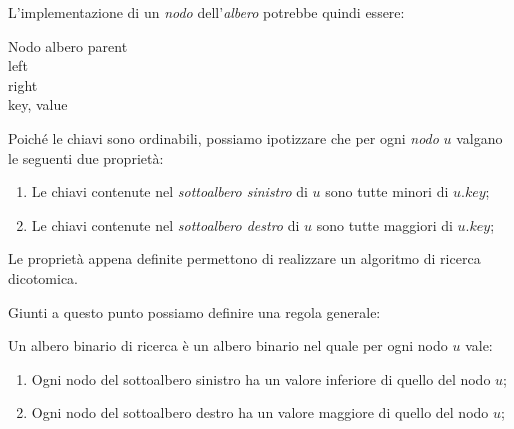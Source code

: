 L'implementazione di un \emph{nodo} dell'\emph{albero} potrebbe quindi essere:
\begin{code}{Nodo albero}
     parent\\
     left\\
     right\\
     key, value
\end{code}\noindent
Poiché le chiavi sono ordinabili, possiamo ipotizzare che per ogni \emph{nodo}
$u$ valgano le seguenti due proprietà:
\begin{enumerate}
    \item Le chiavi contenute nel \emph{sottoalbero sinistro} di $u$ sono
    tutte minori di $u.key$;
    \item Le chiavi contenute nel \emph{sottoalbero destro} di $u$ sono
    tutte maggiori di $u.key$;
\end{enumerate}\newpage
\begin{note}
    Le proprietà appena definite permettono di realizzare un algoritmo di
    ricerca dicotomica.
\end{note}\noindent
Giunti a questo punto possiamo definire una regola generale:\
\begin{definition}
    Un albero binario di ricerca è un albero binario nel quale per ogni nodo $u$
    vale:
    \begin{enumerate}
        \item Ogni nodo del sottoalbero sinistro ha un valore inferiore di quello
        del nodo $u$;
        \item Ogni nodo del sottoalbero destro ha un valore maggiore di quello
        del nodo $u$;
    \end{enumerate}
\end{definition}

